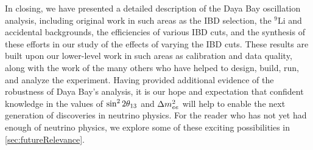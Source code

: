\documentclass[../thesis.tex]{subfiles}
\begin{document}
In closing, we have presented a detailed description of the Daya Bay oscillation analysis, including original work in such areas as the IBD selection, the $^9$Li and accidental backgrounds, the efficiencies of various IBD cuts, and the synthesis of these efforts in our study of the effects of varying the IBD cuts. These results are built upon our lower-level work in such areas as calibration and data quality, along with the work of the many others who have helped to design, build, run, and analyze the experiment. Having provided additional evidence of the robustness of Daya Bay's analysis, it is our hope and expectation that confident knowledge in the values of $\sin^2 2\theta_{13}$ and $\Delta m^2_{ee}$ will help to enable the next generation of discoveries in neutrino physics. For the reader who has not yet had enough of neutrino physics, we explore some of these exciting possibilities in \autoref{sec:futureRelevance}.


\end{document}
